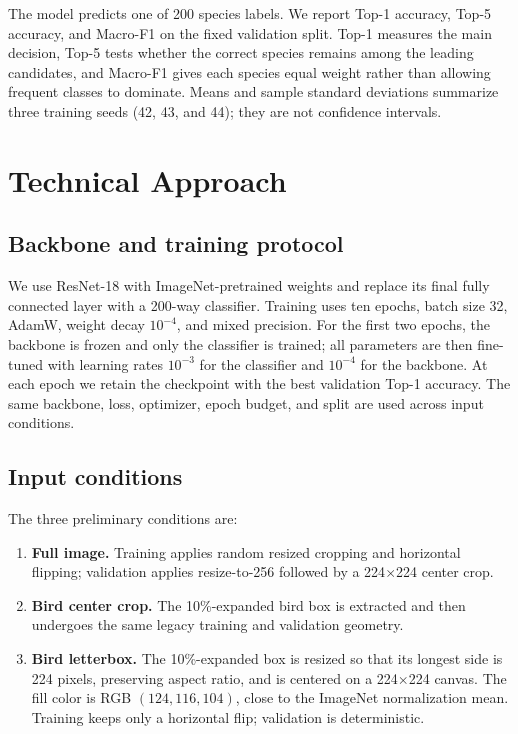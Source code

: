 \documentclass[10pt,twocolumn,letterpaper]{article}
\begin{document}
The model predicts one of 200 species labels. We report Top-1 accuracy, Top-5
accuracy, and Macro-F1 on the fixed validation split. Top-1 measures the main
decision, Top-5 tests whether the correct species remains among the leading
candidates, and Macro-F1 gives each species equal weight rather than allowing
frequent classes to dominate. Means and sample standard deviations summarize
three training seeds (42, 43, and 44); they are not confidence intervals.

\section{Technical Approach}

\subsection{Backbone and training protocol}

We use ResNet-18 with ImageNet-pretrained weights \cite{he2016resnet} and replace
its final fully connected layer with a 200-way classifier. Training uses ten
epochs, batch size 32, AdamW, weight decay $10^{-4}$, and mixed precision. For
the first two epochs, the backbone is frozen and only the classifier is
trained; all parameters are then fine-tuned with learning rates $10^{-3}$ for
the classifier and $10^{-4}$ for the backbone. At each epoch we retain the
checkpoint with the best validation Top-1 accuracy. The same backbone, loss,
optimizer, epoch budget, and split are used across input conditions.

\subsection{Input conditions}

The three preliminary conditions are:

\begin{enumerate}
\item \textbf{Full image.} Training applies random resized cropping and
horizontal flipping; validation applies resize-to-256 followed by a
224$\times$224 center crop.
\item \textbf{Bird center crop.} The 10\%-expanded bird box is extracted and
then undergoes the same legacy training and validation geometry.
\item \textbf{Bird letterbox.} The 10\%-expanded box is resized so that its
longest side is 224 pixels, preserving aspect ratio, and is centered on a
224$\times$224 canvas. The fill color is RGB $(124,116,104)$, close to the
ImageNet normalization mean. Training keeps only a horizontal flip; validation
is deterministic.
\end{enumerate}
\end{document}
